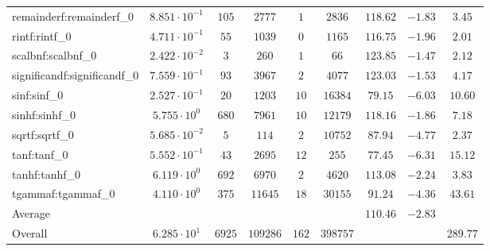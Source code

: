 \begin{tabular}{|l|c|c|c|c|c|c|c|c|}
remainderf:remainderf\_0     & $ 8.851 \cdot 10^{-1} $ & $ 105    $ & $ 2777   $ & $ 1   $ & $ 2836   $ & $ 118.62      $ & $ -1.83   $ & $ 3.45    $ \\
rintf:rintf\_0               & $ 4.711 \cdot 10^{-1} $ & $ 55     $ & $ 1039   $ & $ 0   $ & $ 1165   $ & $ 116.75      $ & $ -1.96   $ & $ 2.01    $ \\
scalbnf:scalbnf\_0           & $ 2.422 \cdot 10^{-2} $ & $ 3      $ & $ 260    $ & $ 1   $ & $ 66     $ & $ 123.85      $ & $ -1.47   $ & $ 2.12    $ \\
significandf:significandf\_0 & $ 7.559 \cdot 10^{-1} $ & $ 93     $ & $ 3967   $ & $ 2   $ & $ 4077   $ & $ 123.03      $ & $ -1.53   $ & $ 4.17    $ \\
sinf:sinf\_0                 & $ 2.527 \cdot 10^{-1} $ & $ 20     $ & $ 1203   $ & $ 10  $ & $ 16384  $ & $ 79.15       $ & $ -6.03   $ & $ 10.60   $ \\
sinhf:sinhf\_0               & $ 5.755 \cdot 10^{0}  $ & $ 680    $ & $ 7961   $ & $ 10  $ & $ 12179  $ & $ 118.16      $ & $ -1.86   $ & $ 7.18    $ \\
sqrtf:sqrtf\_0               & $ 5.685 \cdot 10^{-2} $ & $ 5      $ & $ 114    $ & $ 2   $ & $ 10752  $ & $ 87.94       $ & $ -4.77   $ & $ 2.37    $ \\
tanf:tanf\_0                 & $ 5.552 \cdot 10^{-1} $ & $ 43     $ & $ 2695   $ & $ 12  $ & $ 255    $ & $ 77.45       $ & $ -6.31   $ & $ 15.12   $ \\
tanhf:tanhf\_0               & $ 6.119 \cdot 10^{0}  $ & $ 692    $ & $ 6970   $ & $ 2   $ & $ 4620   $ & $ 113.08      $ & $ -2.24   $ & $ 3.83    $ \\
tgammaf:tgammaf\_0           & $ 4.110 \cdot 10^{0}  $ & $ 375    $ & $ 11645  $ & $ 18  $ & $ 30155  $ & $ 91.24       $ & $ -4.36   $ & $ 43.61   $ \\
\hline
Average                      & $                     $ & $        $ & $        $ & $     $ & $        $ & $ 110.46      $ & $ -2.83   $ & $         $ \\
\hline
Overall                      & $ 6.285 \cdot 10^{1}  $ & $ 6925   $ & $ 109286 $ & $ 162 $ & $ 398757 $ & $             $ & $         $ & $ 289.77  $ \\
\hline
\end{tabular}

